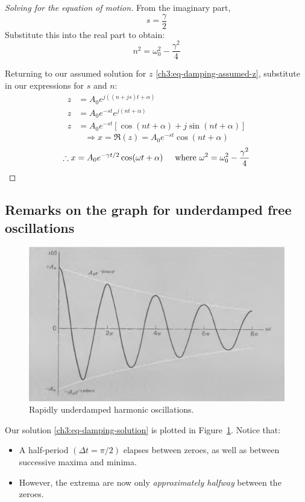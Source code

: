 \begin{proof}[Solving for the equation of motion]
From the imaginary part,
\[ s=\frac{\gamma}{2}\]
Substitute this into the real part to obtain:
\[ n^2 = \omega_0^2 - \frac{\gamma^2}{4} \]

Returning to our assumed solution for $z$ \eqref{ch3:eq-damping-assumed-z}, substitute in our expressions for $s$ and $n$:
\begin{align*}
	z&=A_0 e^{j((n+js)t+\alpha)}  \\
	z &= A_0 e^{-st} e^{j(nt+\alpha)} \\
	z &= A_0 e^{-st} [ \cos(nt+\alpha) + j\sin(nt+\alpha)  ]
\end{align*}
\[ 	\Longrightarrow x = \Re(z) = A_0 e^{-st}\cos(nt+\alpha) \]
\[ \therefore 
x = A_0 e^{-\gamma t/2} \cos(\omega t+\alpha) \hspace{0.5cm}\text{where } \omega^2 = \omega_0^2 - \frac{\gamma^2}{4} \]
\end{proof}


\subsection{Remarks on the graph for underdamped free oscillations}
\begin{figure}
	\centering
	\includegraphics[scale=0.55]{phys232/Ch3-underdamping.png} \caption{Rapidly underdamped harmonic oscillations.}\label{ch3:fig-underdamping}
\end{figure}

Our solution \eqref{ch3:eq-damping-solution} is plotted in Figure~\ref{ch3:fig-underdamping}. Notice that:
\begin{itemize}
	\item A half-period $(\Delta t = \pi/2)$ elapses between zeroes, as well as between successive maxima and minima.
	\item However, the extrema are now only \emph{approximately halfway} between the zeroes.
\end{itemize}

